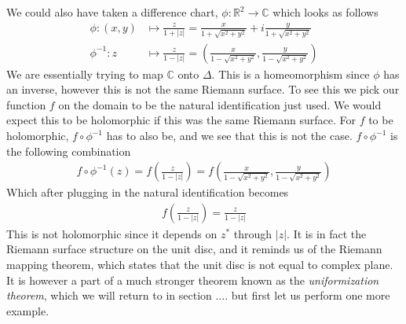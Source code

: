 \documentclass[lettersize,11pt]{article}
\begin{document}
We could also have taken a difference chart, $\phi:\mathds{R}^2\to \mathds{C}$ which looks as follows 
\begin{equation}
	\begin{aligned}
		\phi:(x,y)&\mapsto \frac{z}{1+|z|}=\frac{x}{1+\sqrt{x^2+y^2}}+i\frac{y}{1+\sqrt{x^2+y^2}}\\
		\phi^{-1}:z&\mapsto \frac{z}{1-|z|}=\left(\frac{x}{1-\sqrt{x^2+y^2}},\frac{y}{1-\sqrt{x^2+y^2}}\right)
	\end{aligned}
\end{equation}
We are essentially trying to map $\mathds{C}$ onto $\Delta$. This is a homeomorphism since $\phi$ has an inverse, however this is not the same Riemann surface. To see this we pick our function $f$ on the domain to be the natural identification just used. We would expect this to be holomorphic if this was the same Riemann surface. For $f$ to be holomorphic, $f\circ \phi^{-1}$ has to also be, and we see that this is not the case.  $f\circ \phi^{-1}$ is the following combination
\begin{equation}
	\begin{aligned}
		f\circ \phi^{-1}(z)=f\left(\frac{z}{1-|z|}\right)=f\left(\frac{x}{1-\sqrt{x^2+y^2}},\frac{y}{1-\sqrt{x^2+y^2}}\right)
	\end{aligned}
\end{equation}
Which after plugging in the natural identification becomes
\begin{equation}
	\begin{aligned}
		f\left(\frac{z}{1-|z|}\right)=\frac{z}{1-|z|}
	\end{aligned}
\end{equation}
This is not holomorphic since it depends on $z^*$ through $|z|$. It is in fact the Riemann surface structure on the unit disc, and it reminds us of the Riemann mapping theorem, which states that the unit disc is not equal to complex plane. It is however a part of a much stronger theorem known as the \textit{uniformization theorem}, which we will return to in section ....  but first let us perform one more example.
\end{document}
